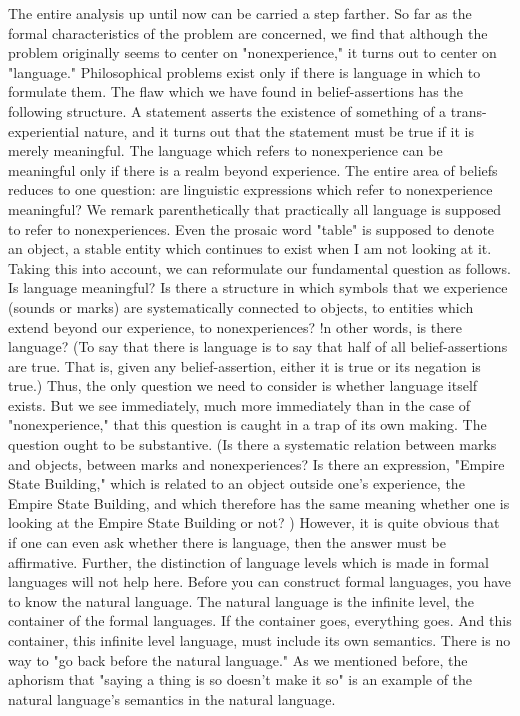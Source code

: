 \documentclass[10pt,twoside,draft]{memoir}
\begin{document}
The entire analysis up until now can be carried a step farther. So far as 
the formal characteristics of the problem are concerned, we find that 
although the problem originally seems to center on "nonexperience," it 
turns out to center on "language." Philosophical problems exist only if there 
is language in which to formulate them. The flaw which we have found in 
belief-assertions has the following structure. A statement asserts the 
existence of something of a trans-experiential nature, and it turns out that 
the statement must be true if it is merely meaningful. The language which 
refers to nonexperience can be meaningful only if there is a realm beyond 
experience. The entire area of beliefs reduces to one question: are linguistic 
expressions which refer to nonexperience meaningful? We remark 
parenthetically that practically all language is supposed to refer to 
nonexperiences. Even the prosaic word "table" is supposed to denote an 
object, a stable entity which continues to exist when I am not looking at it. 
Taking this into account, we can reformulate our fundamental question as 
follows. Is language meaningful? Is there a structure in which symbols that 
we experience (sounds or marks) are systematically connected to objects, to 
entities which extend beyond our experience, to nonexperiences? !n other 
words, is there language? (To say that there is language is to say that half of 
all belief-assertions are true. That is, given any belief-assertion, either it is 
true or its negation is true.) Thus, the only question we need to consider is 
whether language itself exists. But we see immediately, much more 
immediately than in the case of "nonexperience," that this question is 
caught in a trap of its own making. The question ought to be substantive. (Is 
there a systematic relation between marks and objects, between marks and 
nonexperiences? Is there an expression, "Empire State Building," which is 
related to an object outside one's experience, the Empire State Building, and 
which therefore has the same meaning whether one is looking at the Empire 
State Building or not? ) However, it is quite obvious that if one can even ask 
whether there is language, then the answer must be affirmative. Further, the 
distinction of language levels which is made in formal languages will not help 
here. Before you can construct formal languages, you have to know the 
natural language. The natural language is the infinite level, the container of 
the formal languages. If the container goes, everything goes. And this 
container, this infinite level language, must include its own semantics. There 
is no way to "go back before the natural language." As we mentioned 
before, the aphorism that "saying a thing is so doesn't make it so" is an 
example of the natural language's semantics in the natural language. 
\end{document}
